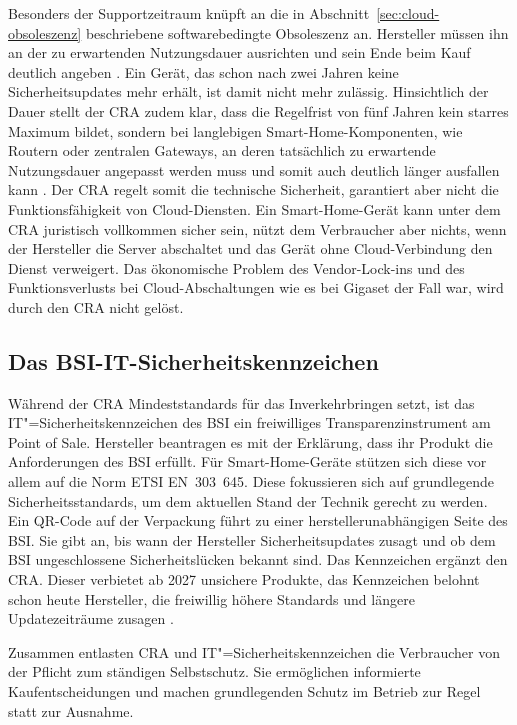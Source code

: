 Besonders der Supportzeitraum knüpft an die in
Abschnitt~\ref{sec:cloud-obsoleszenz} beschriebene softwarebedingte Obsoleszenz
an. Hersteller müssen ihn an der zu erwartenden Nutzungsdauer ausrichten und
sein Ende beim Kauf deutlich angeben \cite{noauthor_regulation_2024}. Ein Gerät, das
schon nach zwei Jahren keine Sicherheitsupdates mehr erhält, ist damit nicht
mehr zulässig. Hinsichtlich der Dauer stellt der CRA zudem klar, dass die Regelfrist von fünf Jahren kein starres Maximum bildet, 
sondern bei langlebigen Smart-Home-Komponenten, wie Routern oder zentralen Gateways, an deren tatsächlich zu erwartende Nutzungsdauer angepasst werden muss und somit auch deutlich länger ausfallen kann \cite{noauthor_regulation_2024}.
Der \gls{CRA} regelt somit die technische Sicherheit, garantiert aber nicht die Funktionsfähigkeit von Cloud-Diensten.
Ein Smart-Home-Gerät kann unter dem \gls{CRA} juristisch vollkommen sicher sein, nützt dem Verbraucher aber nichts, 
wenn der Hersteller die Server abschaltet und das Gerät ohne Cloud-Verbindung den Dienst verweigert. 
Das ökonomische Problem des Vendor-Lock-ins und des Funktionsverlusts bei Cloud-Abschaltungen wie es bei Gigaset der Fall war,
wird durch den \gls{CRA} nicht gelöst.

\subsection{Das BSI-IT-Sicherheitskennzeichen}
Während der \gls{CRA} Mindeststandards für das Inverkehrbringen setzt, ist das
IT"=Sicherheitskennzeichen des \gls{BSI} ein freiwilliges Transparenzinstrument am
Point of Sale. Hersteller beantragen es mit der Erklärung, dass
ihr Produkt die Anforderungen des \gls{BSI} erfüllt. Für Smart-Home-Geräte stützen
sich diese vor allem auf die Norm ETSI EN~303~645. Diese fokussieren
sich auf grundlegende Sicherheitsstandards, um dem aktuellen Stand der Technik gerecht zu werden. 
Ein QR-Code auf der Verpackung führt zu einer herstellerunabhängigen Seite des \gls{BSI}. Sie
gibt an, bis wann der Hersteller Sicherheitsupdates zusagt und ob dem \gls{BSI}
ungeschlossene Sicherheitslücken bekannt sind. Das Kennzeichen
ergänzt den \gls{CRA}. Dieser verbietet ab 2027 unsichere Produkte, das Kennzeichen
belohnt schon heute Hersteller, die freiwillig höhere Standards und längere
Updatezeiträume zusagen \cite{noauthor_it-sicherheitskennzeichen_nodate}.

Zusammen entlasten \gls{CRA} und IT"=Sicherheitskennzeichen die Verbraucher von der
Pflicht zum ständigen Selbstschutz. Sie ermöglichen informierte
Kaufentscheidungen und machen grundlegenden Schutz im Betrieb zur Regel statt
zur Ausnahme.
